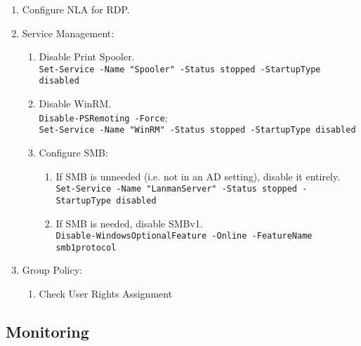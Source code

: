 \documentclass[12pt,letterpaper]{article}
\def\code#1{\textcolor{iris}{\texttt{#1}}}
\begin{document}
\begin{enumerate}
	\item Configure NLA for RDP.
	\item Service Management:
	\begin{enumerate}
		\item Disable Print Spooler. \\
			\code{Set-Service -Name "Spooler" -Status stopped -StartupType disabled}
		\item Disable WinRM. \\
			\code{Disable-PSRemoting -Force}; \\
			\code{Set-Service -Name "WinRM" -Status stopped -StartupType disabled}
		\item Configure SMB:
		\begin{enumerate}
			\item If SMB is unneeded (i.e. not in an AD setting), disable it entirely. \\
				\code{Set-Service -Name "LanmanServer" -Status stopped -StartupType disabled}
			\item If SMB is needed, disable SMBv1. \\
				\code{Disable-WindowsOptionalFeature -Online -FeatureName smb1protocol}
		\end{enumerate}
	\end{enumerate}
	\item Group Policy:
	\begin{enumerate}
		\item Check User Rights Assignment
	\end{enumerate}

\end{enumerate}

\subsection{Monitoring}
\end{document}
